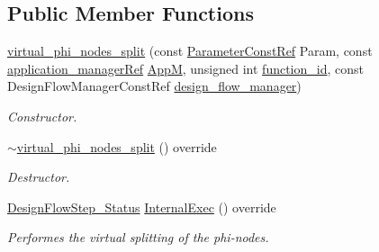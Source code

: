 \subsection*{Public Member Functions}
\begin{DoxyCompactItemize}
\item 
\hyperlink{classvirtual__phi__nodes__split_a7cb1752917240fdf37059d635300d2b9}{virtual\+\_\+phi\+\_\+nodes\+\_\+split} (const \hyperlink{Parameter_8hpp_a37841774a6fcb479b597fdf8955eb4ea}{Parameter\+Const\+Ref} Param, const \hyperlink{application__manager_8hpp_a04ccad4e5ee401e8934306672082c180}{application\+\_\+manager\+Ref} \hyperlink{classFrontendFlowStep_a0ac0d8db2a378416583f51c4faa59d15}{AppM}, unsigned int \hyperlink{classFunctionFrontendFlowStep_a58ef2383ad1a212a8d3f396625a4b616}{function\+\_\+id}, const Design\+Flow\+Manager\+Const\+Ref \hyperlink{classDesignFlowStep_ab770677ddf087613add30024e16a5554}{design\+\_\+flow\+\_\+manager})
\begin{DoxyCompactList}\small\item\em Constructor. \end{DoxyCompactList}\item 
\hyperlink{classvirtual__phi__nodes__split_a0411a0f0626a45e05e6eb43d67880cc8}{$\sim$virtual\+\_\+phi\+\_\+nodes\+\_\+split} () override
\begin{DoxyCompactList}\small\item\em Destructor. \end{DoxyCompactList}\item 
\hyperlink{design__flow__step_8hpp_afb1f0d73069c26076b8d31dbc8ebecdf}{Design\+Flow\+Step\+\_\+\+Status} \hyperlink{classvirtual__phi__nodes__split_a501e5736bc6234a5d835605af57e1fd5}{Internal\+Exec} () override
\begin{DoxyCompactList}\small\item\em Performes the virtual splitting of the phi-\/nodes. \end{DoxyCompactList}\end{DoxyCompactItemize}
